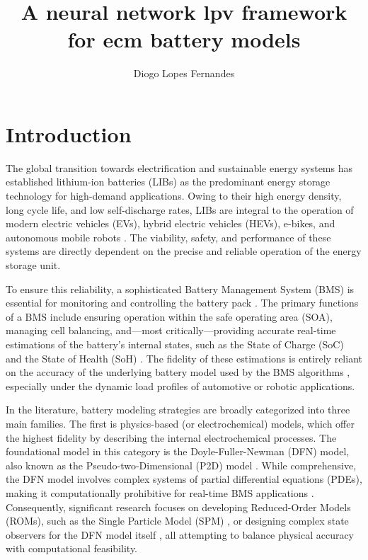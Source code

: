 \documentclass[]{article}
\title{A neural network lpv framework for ecm battery models}
\author{Diogo Lopes Fernandes}
\begin{document}
\maketitle

\begin{abstract}

\end{abstract}

\section{Introduction}

The global transition towards electrification and sustainable energy systems has established lithium-ion batteries (LIBs) as the predominant energy storage technology for high-demand applications. Owing to their high energy density, long cycle life, and low self-discharge rates, LIBs are integral to the operation of modern electric vehicles (EVs), hybrid electric vehicles (HEVs), e-bikes, and autonomous mobile robots \cite{mawuntu2023modeling}. The viability, safety, and performance of these systems are directly dependent on the precise and reliable operation of the energy storage unit.

To ensure this reliability, a sophisticated Battery Management System (BMS) is essential for monitoring and controlling the battery pack \cite{tekin2024comparative}. The primary functions of a BMS include ensuring operation within the safe operating area (SOA), managing cell balancing, and—most critically—providing accurate real-time estimations of the battery's internal states, such as the State of Charge (SoC) and the State of Health (SoH) \cite{damodaran2024fast}. The fidelity of these estimations is entirely reliant on the accuracy of the underlying battery model used by the BMS algorithms \cite{tran2021comprehensive}, especially under the dynamic load profiles of automotive or robotic applications.

In the literature, battery modeling strategies are broadly categorized into three main families. The first is physics-based (or electrochemical) models, which offer the highest fidelity by describing the internal electrochemical processes. The foundational model in this category is the Doyle-Fuller-Newman (DFN) model, also known as the Pseudo-two-Dimensional (P2D) model \cite{piruzjam2024analytical}. While comprehensive, the DFN model involves complex systems of partial differential equations (PDEs), making it computationally prohibitive for real-time BMS applications \cite{khalik2021model}. Consequently, significant research focuses on developing Reduced-Order Models (ROMs), such as the Single Particle Model (SPM) \cite{li2018single, piruzjam2024analytical}, or designing complex state observers for the DFN model itself \cite{drummond2019observer}, all attempting to balance physical accuracy with computational feasibility.
\end{document}
